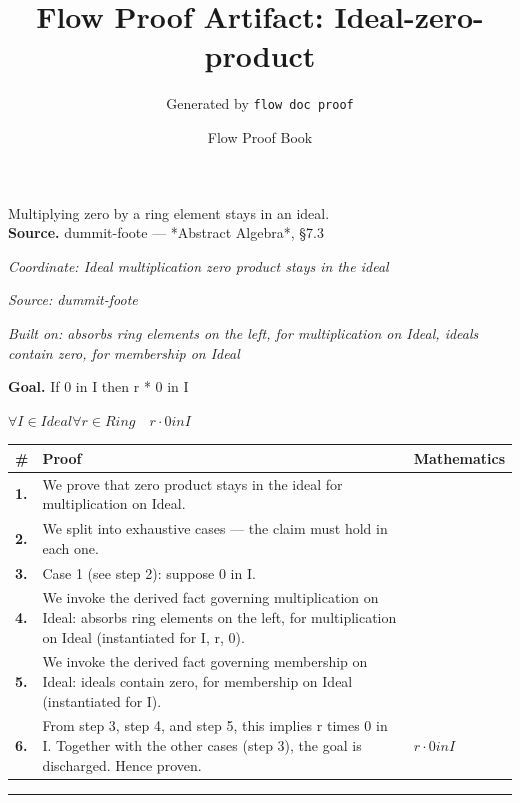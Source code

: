 \documentclass[11pt]{article}
\title{Flow Proof Artifact: Ideal-zero-product}
\author{Generated by \texttt{flow doc proof}}
\date{Flow Proof Book}
\theoremstyle{definition}
\begin{document}
\maketitle
Multiplying zero by a ring element stays in an ideal.\\[0.5em]
\textbf{Source.} dummit-foote — *Abstract Algebra*, §7.3\\[0.5em]
\bigskip
{}\par
\smallskip\noindent\textit{Coordinate: Ideal \cdot multiplication \cdot zero product stays in the ideal}\par
\smallskip\noindent\textit{Source: dummit-foote}\par
\smallskip\noindent\textit{Built on: absorbs ring elements on the left, for multiplication on Ideal, ideals contain zero, for membership on Ideal}\par
\medskip
\noindent\textbf{Goal.} If 0 in I then r * 0 in I\par
\noindent$\displaystyle \forall I \in Ideal \forall r \in Ring\quad r \cdot 0 in I$\par
\medskip
\noindent
\begin{tabular}{@{} >{\raggedright\arraybackslash}p{} >{\raggedright\arraybackslash}p{} >{\raggedleft\arraybackslash}p{} @{}}
\textbf{\#} & \textbf{Proof} & \textbf{Mathematics} \\
\midrule
\textbf{1.} & We prove that zero product stays in the ideal for multiplication on Ideal. & \\[0.45em]
\textbf{2.} & We split into exhaustive cases — the claim must hold in each one. & \\[0.45em]
\textbf{3.} & Case 1 (see step 2): suppose 0 in I. & \\[0.45em]
\textbf{4.} & We invoke the derived fact governing multiplication on Ideal: absorbs ring elements on the left, for multiplication on Ideal (instantiated for I, r, 0). & \\[0.45em]
\textbf{5.} & We invoke the derived fact governing membership on Ideal: ideals contain zero, for membership on Ideal (instantiated for I). & \\[0.45em]
\textbf{6.} & From step 3, step 4, and step 5, this implies r times 0 in I. Together with the other cases (step 3), the goal is discharged. Hence proven. & $\displaystyle r \cdot 0 in I$ \\[0.45em]
\bottomrule
\end{tabular}
\label{thm:Ideal-multiplication-zero_product_stays_in_the_ideal}
\par\medskip\hrule
\end{document}

